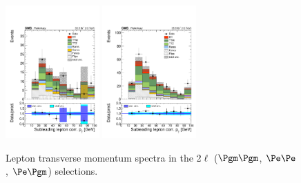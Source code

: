 \begin{figure}[htb]
\includegraphics[width=0.32\textwidth]{plots_leptons/lep_evtsel/2lss_SR/ee/kinMVA_input_LepGood1_conePt.pdf}
\includegraphics[width=0.32\textwidth]{plots_leptons/lep_evtsel/2lss_SR/em/kinMVA_input_LepGood1_conePt.pdf}
	\caption{Lepton transverse momentum spectra in the 2$\ell$ ($\Pgm\Pgm$, $\Pe\Pe$, $\Pe\Pgm$) selections.}
	\label{fig:2l_lepPt}
\end{figure}
